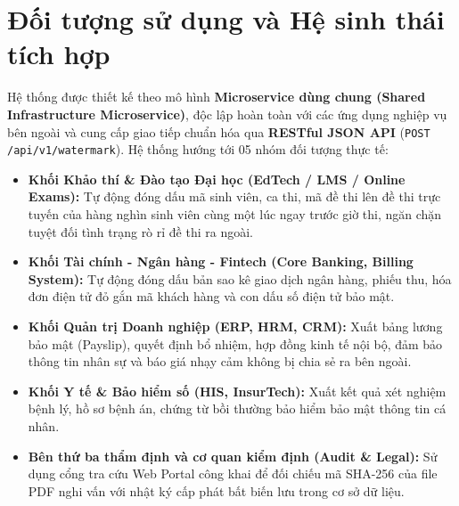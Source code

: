 \documentclass[12pt,a4paper]{report}
\begin{document}
\section{Đối tượng sử dụng và Hệ sinh thái tích hợp}
Hệ thống được thiết kế theo mô hình \textbf{Microservice dùng chung (Shared Infrastructure Microservice)}, độc lập hoàn toàn với các ứng dụng nghiệp vụ bên ngoài và cung cấp giao tiếp chuẩn hóa qua \textbf{RESTful JSON API} (\texttt{POST /api/v1/watermark}). Hệ thống hướng tới 05 nhóm đối tượng thực tế:
\begin{itemize}
    \item \textbf{Khối Khảo thí \& Đào tạo Đại học (EdTech / LMS / Online Exams):} Tự động đóng dấu mã sinh viên, ca thi, mã đề thi lên đề thi trực tuyến của hàng nghìn sinh viên cùng một lúc ngay trước giờ thi, ngăn chặn tuyệt đối tình trạng rò rỉ đề thi ra ngoài.
    \item \textbf{Khối Tài chính - Ngân hàng - Fintech (Core Banking, Billing System):} Tự động đóng dấu bản sao kê giao dịch ngân hàng, phiếu thu, hóa đơn điện tử đỏ gắn mã khách hàng và con dấu số điện tử bảo mật.
    \item \textbf{Khối Quản trị Doanh nghiệp (ERP, HRM, CRM):} Xuất bảng lương bảo mật (Payslip), quyết định bổ nhiệm, hợp đồng kinh tế nội bộ, đảm bảo thông tin nhân sự và báo giá nhạy cảm không bị chia sẻ ra bên ngoài.
    \item \textbf{Khối Y tế \& Bảo hiểm số (HIS, InsurTech):} Xuất kết quả xét nghiệm bệnh lý, hồ sơ bệnh án, chứng từ bồi thường bảo hiểm bảo mật thông tin cá nhân.
    \item \textbf{Bên thứ ba thẩm định và cơ quan kiểm định (Audit \& Legal):} Sử dụng cổng tra cứu Web Portal công khai để đối chiếu mã SHA-256 của file PDF nghi vấn với nhật ký cấp phát bất biến lưu trong cơ sở dữ liệu.
\end{itemize}
\end{document}

